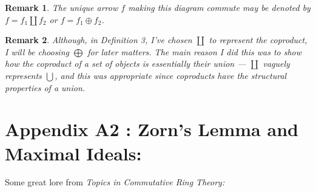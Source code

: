 \documentclass[12pt,reqno]{amsart}
\theoremstyle{plain}
\newtheorem{rem}{Remark}
\begin{document}
\begin{rem} The unique arrow $f$ making this diagram commute may be denoted by $f = f_1 \coprod f_2$ or $f = f_1 \oplus f_2$. 
\end{rem} 
\begin{rem} Although, in Definition 3, I've chosen $\coprod$ to represent the coproduct, I will be choosing $\bigoplus$ for later matters. The main reason I did this was to show how the coproduct of a set of objects is essentially their union — $\coprod$ vaguely represents $\bigcup$, and this was appropriate since coproducts have the structural properties of a union.
\end{rem} 


\newpage 
\section*{Appendix A2 : Zorn’s Lemma and Maximal Ideals:}

Some great lore from \textit{Topics in Commutative Ring Theory:}
\end{document}
